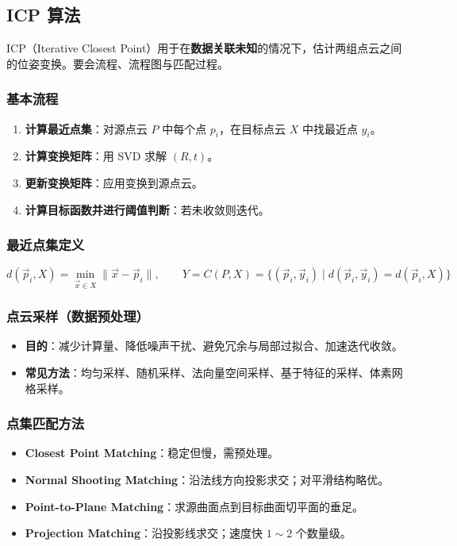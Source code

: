 \documentclass[11pt,a4paper]{article}
\begin{document}
\subsection{ICP 算法}

\begin{keypoint}
ICP（Iterative Closest Point）用于在\textbf{数据关联未知}的情况下，估计两组点云之间的位姿变换。要会流程、流程图与匹配过程。
\end{keypoint}

\subsubsection*{基本流程}
\begin{enumerate}
  \item \textbf{计算最近点集}：对源点云 $P$ 中每个点 $p_i$，在目标点云 $X$ 中找最近点 $y_i$。
  \item \textbf{计算变换矩阵}：用 SVD 求解 $(R,t)$。
  \item \textbf{更新变换矩阵}：应用变换到源点云。
  \item \textbf{计算目标函数并进行阈值判断}：若未收敛则迭代。
\end{enumerate}

\subsubsection*{最近点集定义}
\[
d(\vec{p}_i,X)=\min_{\vec{x}\in X}\|\vec{x}-\vec{p}_i\|,\qquad
Y=C(P,X)=\bigl\{(\vec{p}_i,\vec{y}_i)\mid d(\vec{p}_i,\vec{y}_i)=d(\vec{p}_i,X)\bigr\}
\]

\subsubsection*{点云采样（数据预处理）}
\begin{itemize}
  \item \textbf{目的}：减少计算量、降低噪声干扰、避免冗余与局部过拟合、加速迭代收敛。
  \item \textbf{常见方法}：均匀采样、随机采样、法向量空间采样、基于特征的采样、体素网格采样。
\end{itemize}

\subsubsection*{点集匹配方法}
\begin{itemize}
  \item \textbf{Closest Point Matching}：稳定但慢，需预处理。
  \item \textbf{Normal Shooting Matching}：沿法线方向投影求交；对平滑结构略优。
  \item \textbf{Point-to-Plane Matching}：求源曲面点到目标曲面切平面的垂足。
  \item \textbf{Projection Matching}：沿投影线求交；速度快 $1\sim2$ 个数量级。
\end{itemize}
\end{document}
